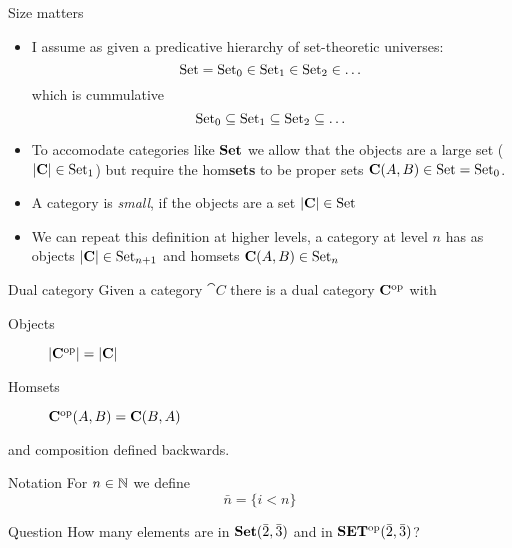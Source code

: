 \documentclass[handout]{beamer}
\begin{document}
\begin{frame}{Size matters}

  \pause
  \begin{itemize}
  \item<+-> I assume as given a predicative hierarchy of set-theoretic
    universes:
    \[ \mathrm{Set} = \mathrm{Set}_0 \in \mathrm{Set}_1 \in \mathrm{Set}_2 \in \dots \]
    which is cummulative
    \[ \mathrm{Set}_0 \subseteq \mathrm{Set}_1 \subseteq \mathrm{Set}_2 \subseteq \dots \]

  \item<+-> To accomodate categories like $\mathbf{Set}$ we allow that the objects are
    a large set ($|\mathbf{C}| \in \mathrm{Set}_1$) but require the hom\textbf{sets} to be proper sets 
    $\mathbf{C}(A,B) \in \mathrm{Set} = \mathrm{Set}_0$.

  \item<+-> A category is \emph{small}, if the objects are a set $|\mathbf{C}| \in \mathrm{Set}$

  \item<+-> We can repeat this definition at higher levels, a category at level $n$
    has as objects $|\mathbf{C}|\in\mathrm{Set}_{n+1}$ and homsets  $\mathbf{C}(A,B) \in \mathrm{Set}_n$
    
  \end{itemize}
  
\end{frame}

\begin{frame}
  \begin{block}{Dual category}
    Given a category $\cat{C}$ there is a dual category $\mathbf{C}^{\mathrm{op}}$ 
    with
    \begin{description}
    \item[Objects] $|\mathbf{C}^{\mathrm{op}}| = |\mathbf{C}|$
    \item[Homsets] $\mathbf{\mathbf{C}^{\mathrm{op}}}(A,B) = \mathbf{C}(B,A)$
    \end{description}
    and composition defined backwards.
  \end{block}

  \pause
  \begin{block}{Notation}
    For $n\in\mathbb{N}$ we define
    \[ \bar{n} = \{ i < n \} \]
  \end{block}

  \pause
  \begin{block}{Question}
    How many elements are in $\mathbf{Set}(\bar{2},\bar{3})$ and in $\mathbf{SET^{\mathrm{op}}}(\bar{2},\bar{3})$?
  \end{block}
  
\end{frame}
\end{document}
